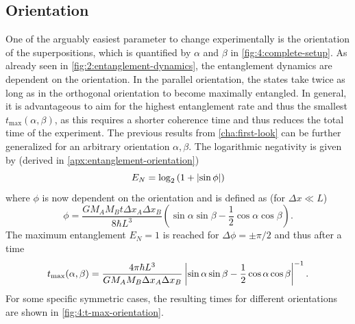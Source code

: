 \subsection{Orientation}
One of the arguably easiest parameter to change experimentally is the orientation of the superpositions, which is quantified by $\alpha$ and $\beta$ in \cref{fig:4:complete-setup}.
As already seen in \cref{fig:2:entanglement-dynamics}, the entanglement dynamics are dependent on the orientation.
In the parallel orientation, the states take twice as long as in the orthogonal orientation to become maximally entangled.
In general, it is advantageous to aim for the highest entanglement rate and thus the smallest $t_\mathrm{max}(\alpha, \beta)$, as this requires a shorter coherence time and thus reduces the total time of the experiment.
The previous results from \cref{cha:first-look} can be further generalized for an arbitrary orientation $\alpha, \beta$. The logarithmic negativity is given by (derived in \cref{apx:entanglement-orientation})
\begin{equation}
  E_N = \log_2\left(1+\left\lvert\sin\phi\right\rvert\right)
\end{equation}
where $\phi$ is now dependent on the orientation and is defined as (for $\Delta x \ll L$)
\begin{equation}\label{eq:4:phi-orientation}
  \phi = \frac{G M_A M_B t \Delta x_A \Delta x_B}{8\hbar L^3} \left(\sin\alpha\sin\beta-\frac{1}{2}\cos\alpha\cos\beta\right) .
\end{equation}
The maximum entanglement $E_N=1$ is reached for $\Delta\phi = \pm \pi/2$ and thus after a time
\begin{equation}\label{eq:4:t-max}
  t_\mathrm{max}(\alpha,\beta) = \frac{4\pi \hbar L^3}{G M_A M_B \Delta x_A \Delta x_B}\left\lvert\sin\alpha\sin\beta - \frac{1}{2}\cos\alpha\cos\beta\right\rvert^{-1}.
\end{equation}
For some specific symmetric cases, the resulting times for different orientations are shown in \cref{fig:4:t-max-orientation}.
